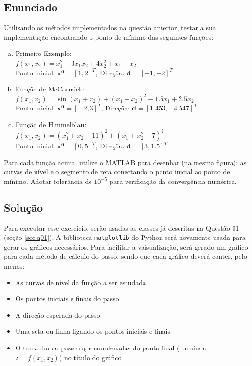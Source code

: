 \documentclass[10pt, a4paper]{article}
\begin{document}
\subsection{Enunciado}

Utilizando os métodos implementados na questão anterior, testar a sua
implementação encontrando o ponto de mínimo das seguintes funções:

\begin{enumerate}[(a)]
  \item Primeiro Exemplo: \\
        $f(x_1, x_2) = x_1^2 - 3x_1x_2 + 4x_2^2 + x_1 - x_2$ \\
        Ponto inicial: $\mathbf{x^0} = [1, 2]^T$, Direção: $\mathbf{d} = [-1, -2]^T$\label{func:a}
  \item Função de McCormick: \\
        $f(x_1, x_2) = \sin{(x_1 + x_2)} + (x_1 - x_2)^2 - 1.5x_1 + 2.5x_2$ \\
        Ponto inicial: $\mathbf{x^0} = [-2, 3]^T$, Direção: $\mathbf{d} = [1.453, -4.547]^T$\label{func:b}
  \item Função de Himmelblau: \\
        $f(x_1, x_2) = (x_1^2 + x_2 - 11)^2 + (x_1 + x_2^2 - 7)^2$ \\
        Ponto inicial: $\mathbf{x^0} = [0, 5]^T$, Direção: $\mathbf{d} = [3, 1.5]^T$\label{func:c}
\end{enumerate}

Para cada função acima, utilize o MATLAB para desenhar (na mesma figura): as
curvas de nível e o segmento de reta conectando o ponto inicial ao ponto de mínimo.
Adotar tolerância de $10^{-5}$ para verificação da convergência numérica.

\subsection{Solução}

Para executar esse exercício, serão usadas as classes já descritas na Questão 01 (seção \ref{sec:q01}). A biblioteca {\tt matplotlib} do Python será 
novamente usada para gerar os gráficos necessários. Para facilitar a vaisualização, será gerado um gráfico para cada método de cálculo do passo, sendo que 
cada gráfico deverá conter, pelo menos:

\begin{itemize}
  \item As curvas de nível da função a ser estudada
  \item Os pontos iniciais e finais do passo
  \item A direção esperada do passo
  \item Uma seta ou linha ligando os pontos iniciais e finais
  \item O tamanho do passo $\alpha_k$ e coordenadas do ponto final (incluindo $z = f(x_1, x_2)$) no título do gráfico
\end{itemize}
\end{document}
